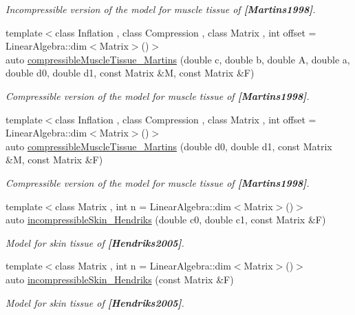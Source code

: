\begin{DoxyCompactItemize}
\begin{DoxyCompactList}\small\item\em Incompressible version of the model for muscle tissue of {\bfseries [Martins1998]}. \end{DoxyCompactList}\item 
{\footnotesize template$<$class Inflation , class Compression , class Matrix , int offset = Linear\+Algebra\+::dim$<$\+Matrix$>$()$>$ }\\auto \hyperlink{group__Biomechanics_gad831914c493a3da04ed40c3c0ce87a62}{compressible\+Muscle\+Tissue\+\_\+\+Martins} (double c, double b, double A, double a, double d0, double d1, const Matrix \&M, const Matrix \&F)
\begin{DoxyCompactList}\small\item\em Compressible version of the model for muscle tissue of {\bfseries [Martins1998]}. \end{DoxyCompactList}\item 
{\footnotesize template$<$class Inflation , class Compression , class Matrix , int offset = Linear\+Algebra\+::dim$<$\+Matrix$>$()$>$ }\\auto \hyperlink{group__Biomechanics_ga46a70ccb2285e12addad87b6a8aaaae8}{compressible\+Muscle\+Tissue\+\_\+\+Martins} (double d0, double d1, const Matrix \&M, const Matrix \&F)
\begin{DoxyCompactList}\small\item\em Compressible version of the model for muscle tissue of {\bfseries [Martins1998]}. \end{DoxyCompactList}\item 
{\footnotesize template$<$class Matrix , int n = Linear\+Algebra\+::dim$<$\+Matrix$>$()$>$ }\\auto \hyperlink{group__Biomechanics_gaa20bf15ef6976d64d89490429035b2c4}{incompressible\+Skin\+\_\+\+Hendriks} (double c0, double c1, const Matrix \&F)
\begin{DoxyCompactList}\small\item\em Model for skin tissue of {\bfseries [Hendriks2005]}. \end{DoxyCompactList}\item 
{\footnotesize template$<$class Matrix , int n = Linear\+Algebra\+::dim$<$\+Matrix$>$()$>$ }\\auto \hyperlink{group__Biomechanics_gad8653218bd2afb4e3cfd601a5142956c}{incompressible\+Skin\+\_\+\+Hendriks} (const Matrix \&F)
\begin{DoxyCompactList}\small\item\em Model for skin tissue of {\bfseries [Hendriks2005]}. \end{DoxyCompactList}\item 

\end{DoxyCompactItemize}
